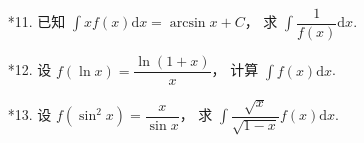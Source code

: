 \begin{enumerate}
    \item[*11.] 已知 $\displaystyle\int xf(x)\text{d}x=\arcsin x+C$，
    求 $\displaystyle\int\dfrac{1}{f(x)}\text{d}x$.

    \item[*12.] 设 $f(\ln x)=\dfrac{\ln(1+x)}{x}$，
    计算 $\displaystyle\int f(x)\text{d}x$.
    
    \item[*13.] 设 $f(\sin^2x)=\dfrac{x}{\sin x}$，
    求 $\displaystyle\int\dfrac{\sqrt{x}}{\sqrt{1-x}}f(x)\text{d}x$. 




\end{enumerate}